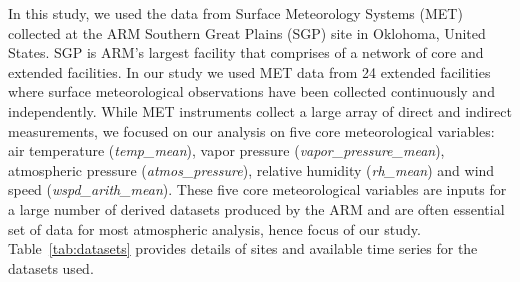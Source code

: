 In this study, we used the data from Surface Meteorology Systems (MET)
collected at the ARM Southern Great Plains (SGP) site in
Oklohoma, United States. SGP is ARM's largest facility that
comprises of a network of core and extended facilities. In our study we
used MET data from 24 extended facilities where surface meteorological
observations have been collected continuously and independently. 
While MET instruments collect a large array of direct and indirect
measurements, we focused on our analysis on five core meteorological variables:
air temperature (\textit{temp\_mean}), vapor pressure
(\textit{vapor\_pressure\_mean}),
atmospheric pressure (\textit{atmos\_pressure}), relative humidity
(\textit{rh\_mean}) and wind speed
(\textit{wspd\_arith\_mean}). These five core meteorological variables are
inputs for a large number of derived datasets produced by the ARM and
are often essential set of data for most atmospheric analysis, hence
focus of our study. Table~\ref{tab:datasets} provides details of sites
and available time series for the datasets used.


